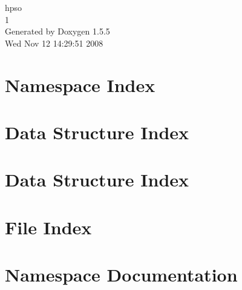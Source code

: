 \documentclass[a4paper]{book}
\begin{document}
\begin{titlepage}
\vspace*{7cm}
\begin{center}
{\Large hpso \\[1ex]\large 1 }\\
\vspace*{1cm}
{\large Generated by Doxygen 1.5.5}\\
\vspace*{0.5cm}
{\small Wed Nov 12 14:29:51 2008}\\
\end{center}
\end{titlepage}
\clearemptydoublepage
{}
\tableofcontents
\clearemptydoublepage
{}
\chapter{Namespace Index}

\chapter{Data Structure Index}

\chapter{Data Structure Index}

\chapter{File Index}

\chapter{Namespace Documentation}













\end{document}
